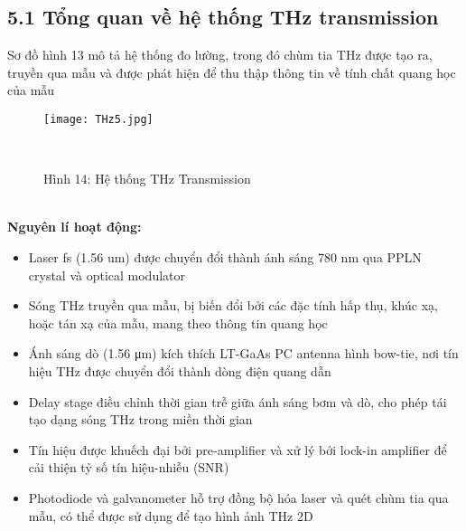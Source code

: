 \documentclass[a4paper,13pt]{article} %
\begin{document}
\subsection{5.1 Tổng quan về hệ thống THz transmission}
Sơ đồ hình 13 mô tả hệ thống đo lường, trong đó chùm tia THz được tạo ra, truyền qua mẫu và được phát hiện để thu thập thông tin về tính chất quang học của mẫu
\begin{figure}[htbp]
    \centering
\texttt{[image: THz5.jpg]}
    \caption*{Hình 14: Hệ thống THz Transmission\cite{key6} } \\

    \label{fig:model}
\end{figure} \\
\textbf{Nguyên lí hoạt động:}
\begin{itemize}
\item Laser fs (1.56 um) được chuyển đổi thành ánh sáng 780 nm qua PPLN crystal và optical modulator
\item Sóng THz truyền qua mẫu, bị biến đổi bởi các đặc tính hấp thụ, khúc xạ, hoặc tán xạ của mẫu, mang theo thông tin quang học
\item Ánh sáng dò (1.56 μm) kích thích LT-GaAs PC antenna hình bow-tie, nơi tín hiệu THz được chuyển đổi thành dòng điện quang dẫn
\item Delay stage điều chỉnh thời gian trễ giữa ánh sáng bơm và dò, cho phép tái tạo dạng sóng THz trong miền thời gian
\item Tín hiệu được khuếch đại bởi pre-amplifier và xử lý bởi lock-in amplifier để cải thiện tỷ số tín hiệu-nhiễu (SNR)
\item Photodiode và galvanometer hỗ trợ đồng bộ hóa laser và quét chùm tia qua mẫu, có thể được sử dụng để tạo hình ảnh THz 2D
\end{itemize}
\end{document}
